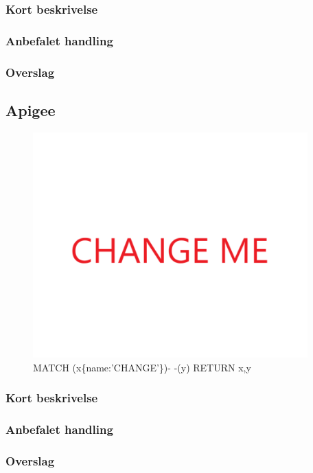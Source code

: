 \documentclass{article}
\begin{document}
\subsubsection{Kort beskrivelse}
\subsubsection{Anbefalet handling}
\subsubsection{Overslag}


\subsection{Apigee}
\begin{figure}[h]
\includegraphics[width=300pt]{CHANGE.PNG}
\caption{MATCH (x\{name:'CHANGE'\})- -(y) RETURN x,y}
\end{figure}
\subsubsection{Kort beskrivelse}
\subsubsection{Anbefalet handling}
\subsubsection{Overslag}
\end{document}
